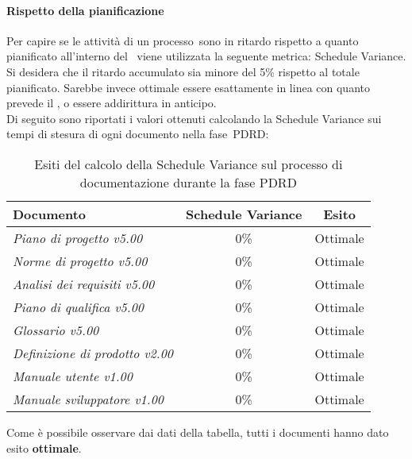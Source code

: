 \documentclass[../PianoDiQualifica.tex]{subfiles}
\begin{document}
\begin{appendices}
			\paragraph{Rispetto della pianificazione}
			Per capire se le attività di un processo\g\ sono in ritardo rispetto a quanto pianificato all'interno del \pianodiprogetto\ viene utilizzata la seguente metrica: Schedule Variance.\\
			Si desidera che il ritardo accumulato sia minore del 5\% rispetto al totale pianificato. Sarebbe invece ottimale essere esattamente in linea con quanto prevede il \pianodiprogetto, o essere addirittura in anticipo.\\
			Di seguito sono riportati i valori ottenuti calcolando la Schedule Variance sui tempi di stesura di ogni documento nella fase\g\ PDRD:
			\begin{table}[H]
				\centering
				\begin{tabular}{l * {2}{c}}
					\toprule
					\textbf{Documento} & \textbf{Schedule Variance} & \textbf{Esito} \\
					\midrule
					\textit{Piano di progetto v5.00} & 0\% &  Ottimale \\
					\textit{Norme di progetto v5.00} & 0\% &  Ottimale \\
					\textit{Analisi dei requisiti v5.00} & 0\% &  Ottimale \\
					\textit{Piano di qualifica v5.00} & 0\% &  Ottimale \\
					\textit{Glossario v5.00} & 0\% &  Ottimale \\
					\textit{Definizione di prodotto v2.00} & 0\% &  Ottimale \\
					\textit{Manuale utente v1.00} & 0\% &  Ottimale \\
					\textit{Manuale sviluppatore v1.00} & 0\% &  Ottimale \\
					\bottomrule
				\end{tabular}
				\caption{Esiti del calcolo della Schedule Variance sul processo di documentazione durante la fase PDRD}
				\label{tab:esiti_schedule_variance}
			\end{table}
			
			Come è possibile osservare dai dati della tabella, tutti i documenti hanno dato esito \textbf{ottimale}.
			

\end{appendices}
\end{document}
